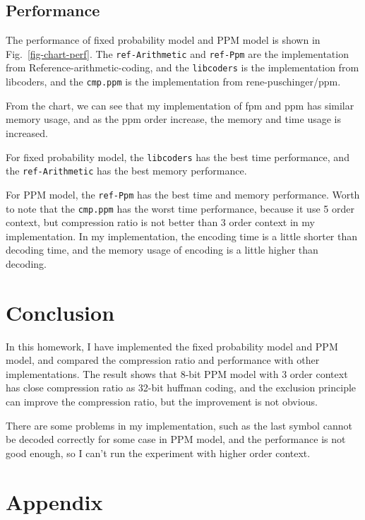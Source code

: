 \documentclass[a4paper,conference]{IEEEtran}
\begin{document}
\subsection{Performance}

The performance of fixed probability model and PPM model is shown in Fig.~\ref{fig-chart-perf}.
The \texttt{ref-Arithmetic} and \texttt{ref-Ppm} are the implementation from Reference-arithmetic-coding\cite{Reference-arithmetic-coding}, and the \texttt{libcoders} is the implementation from libcoders\cite{libcoders}, and the \texttt{cmp.ppm} is the implementation from rene-puschinger/ppm\cite{rene-puschinger/ppm}.

From the chart, we can see that my implementation of fpm and ppm has similar memory usage, and as the ppm order increase, the memory and time usage is increased.

For fixed probability model, the \texttt{libcoders} has the best time performance, and the \texttt{ref-Arithmetic} has the best memory performance.

For PPM model, the \texttt{ref-Ppm} has the best time and memory performance.
Worth to note that the \texttt{cmp.ppm} has the worst time performance, because it use 5 order context, but compression ratio is not better than 3 order context in my implementation.
In my implementation, the encoding time is a little shorter than decoding time, and the memory usage of encoding is a little higher than decoding.

\section{Conclusion}

In this homework, I have implemented the fixed probability model and PPM model, and compared the compression ratio and performance with other implementations.
The result shows that 8-bit PPM model with 3 order context has close compression ratio as 32-bit huffman coding, and the exclusion principle can improve the compression ratio, but the improvement is not obvious.

There are some problems in my implementation, such as the last symbol cannot be decoded correctly for some case in PPM model, and the performance is not good enough, so I can't run the experiment with higher order context.

\section{Appendix}
\end{document}
